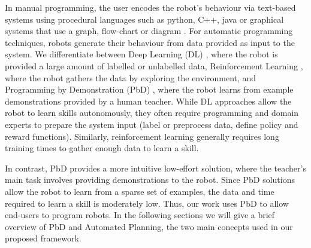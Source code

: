 In manual programming, the user encodes the robot's behaviour via text-based systems using procedural languages such as python, C++, java or graphical systems that use a graph, flow-chart or diagram \cite{lego2003,fraser2013blockly,majed2014learn}.
For automatic programming techniques, robots generate their behaviour from data provided as input to the system. 
We differentiate between Deep Learning (DL) \cite{schmidhuber2015deep}, where the robot is provided a large amount of labelled or unlabelled data, Reinforcement Learning \cite{kaelbling1996reinforcement,gosavi2009reinforcement}, where the robot gathers the data by exploring the environment, and Programming by Demonstration (PbD) \cite{billard2008robot,argall2009survey}, where the robot learns from example demonstrations provided by a human teacher.
While DL approaches allow the robot to learn skills autonomously, they often require programming and domain experts to prepare the system input (\eg label or preprocess data, define policy and reward functions). 
Similarly, reinforcement learning generally requires long training times to gather enough data to learn a skill.

In contrast, PbD provides a more intuitive low-effort solution, where the teacher's main task involves providing demonstrations to the robot.
Since PbD solutions allow the robot to learn from a sparse set of examples, the data and time required to learn a skill is moderately low.
Thus, our work uses PbD to allow end-users to program robots.
In the following sections we will give a brief overview of PbD and Automated Planning, the two main concepts used in our proposed framework.

